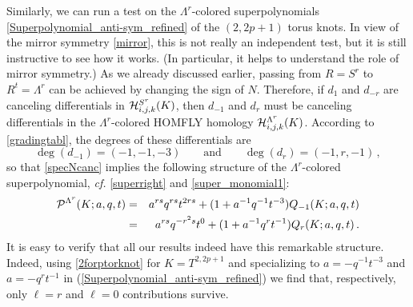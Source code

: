 \documentclass[hyper,letterpaper]{JHEP3}
\newcommand{\be}{\begin{equation}}
\newcommand{\ee}{\end{equation}}
\newcommand{\cH}{{\cal H }}
\renewcommand{\P}{{\cal P}}
\begin{document}
Similarly, we can run a test on the $\Lambda^r$-colored superpolynomials \eqref{Superpolynomial_anti-sym_refined}
of the $(2,2p+1)$ torus knots. In view of the mirror symmetry \eqref{mirror}, this is not really an independent test,
but it is still instructive to see how it works. (In particular, it helps to understand the role of mirror symmetry.)
As we already discussed earlier, passing from $R = S^r$ to $R^t = \Lambda^r$ can be achieved by changing the sign of $N$.
Therefore, if $d_1$ and $d_{-r}$ are canceling differentials in $\cH^{S^r}_{i,j,k} (K)$,
then $d_{-1}$ and $d_r$ must be canceling differentials in the $\Lambda^r$-colored HOMFLY homology $\cH^{\Lambda^r}_{i,j,k} (K)$.
According to \eqref{gradingtabl}, the degrees of these differentials are
\be
\deg (d_{-1}) = (-1,-1,-3) \qquad \text{and} \qquad \deg (d_{r}) = (-1,r,-1) \,,
\ee
so that \eqref{specNcanc} implies the following structure of the $\Lambda^r$-colored superpolynomial,
{\it cf.} \eqref{superright} and \eqref{super_monomial1}:
\begin{eqnarray}
\P^{\Lambda^r} (K; a,q,t) &=& a^{rs} q^{rs} t^{2rs} + (1+a^{-1}q^{-1}t^{-3}) Q_{-1} (K;a,q,t)
\nonumber \\
&=& a^{rs} q^{-r^2s} t^0 + (1+a^{-1}q^{r}t^{-1}) Q_{r} (K;a,q,t) \,.
\label{super_monomial2}
\end{eqnarray}
It is easy to verify that all our results indeed have this remarkable structure.
Indeed, using \eqref{2forptorknot} for $K = T^{2,2p+1}$ and specializing to $a=-q^{-1}t^{-3}$ and $a=-q^{r}t^{-1}$
in (\ref{Superpolynomial_anti-sym_refined}) we find that, respectively, only $\ell=r$ and $\ell=0$ contributions survive.\\
\end{document}
